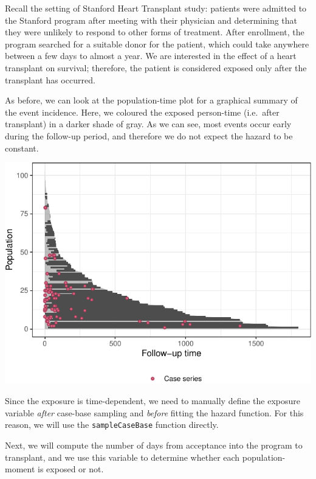 \documentclass[
]{jss}
\begin{document}
Recall the setting of Stanford Heart Transplant study: patients were
admitted to the Stanford program after meeting with their physician and
determining that they were unlikely to respond to other forms of
treatment. After enrollment, the program searched for a suitable donor
for the patient, which could take anywhere between a few days to almost
a year. We are interested in the effect of a heart transplant on
survival; therefore, the patient is considered exposed only after the
transplant has occurred.

As before, we can look at the population-time plot for a graphical
summary of the event incidence. Here, we coloured the exposed
person-time (i.e.~after transplant) in a darker shade of gray. As we can
see, most events occur early during the follow-up period, and therefore
we do not expect the hazard to be constant.

\begin{CodeChunk}


\begin{center}\includegraphics[width=\textwidth,keepaspectratio=true]{../figures/stanford-poptime-1} \end{center}

\end{CodeChunk}

Since the exposure is time-dependent, we need to manually define the
exposure variable \emph{after} case-base sampling and \emph{before}
fitting the hazard function. For this reason, we will use the
\texttt{sampleCaseBase} function directly.

Next, we will compute the number of days from acceptance into the
program to transplant, and we use this variable to determine whether
each population-moment is exposed or not.
\end{document}
